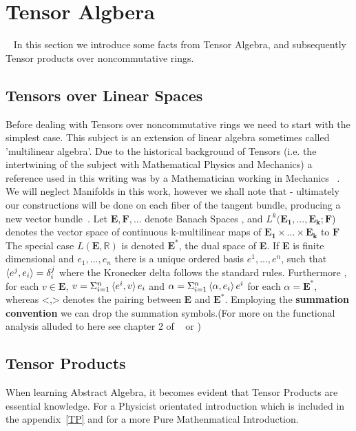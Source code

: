 \documentclass[preprint, 5p, 10pt]{elsarticle}
\theoremstyle{plain}
\begin{document}
\section{Tensor Algbera}~\cite{Lang,Yokonuma1992,Nielsen2000}
In this section we introduce some facts from Tensor Algebra, and subsequently Tensor products over noncommutative rings. 
\subsection{Tensors over Linear Spaces}
Before dealing with Tensors over noncommutative rings we need to start with the simplest
case. This subject is an extension of linear algebra sometimes called 'multilinear algebra'. Due to the 
historical background of Tensors (i.e. the intertwining of the subject with Mathematical Physics
and Mechanics) a reference used in this writing was by a Mathematician working in Mechanics ~\cite{Marsden}.
We will neglect Manifolds in this work, however we shall note that - ultimately our constructions will be
done on each fiber of the tangent bundle, producing a new vector bundle~\cite{GeometricPhasesinClassicalandQuantum,
Marsden,FoundationsDiffMan}. 
Let $\mathbf{E,F,...}$ denote Banach Spaces ,
and $L^{k}(\mathbf{E_{1},...,E_{k};F}$) denotes the vector space of continuous
k-multilinear maps of $\mathbf{E_{1}}\times...\times\mathbf{E_{k}}$ to $\mathbf{F}$
The special case $L(\mathbf{E},\mathbb{R})$ is denoted $\mathbf{E^{*}}$,
the dual space of \textbf{E}. If \textbf{E} is finite dimensional and ${e_{1},...,e_{n}}$ there is a 
unique ordered basis ${e^{1},...,e^{n}}$, such that $\braket{e^{j},e_{i}} = \delta^{j}_{i}$ where
the Kronecker delta follows the standard rules. Furthermore , for each $v \in \mathbf{E}$,
$v=\Sigma_{i=1}^{n}\braket{e^{i},v}e_{i}$ and $\alpha=\Sigma_{i=1}^{n}\braket{\alpha,e_{i}}e^{i}$
for each $\alpha = \mathbf{E}^{*}$, whereas <,> denotes the pairing between 
\textbf{E} and $\mathbf{E^{*}}$. Employing the \textbf{summation convention} we can drop the summation
symbols.(For more on the functional analysis alluded to here see chapter 2 of ~\cite{Marsden} or \cite{RudinFA})
\subsection{Tensor Products}
When learning Abstract Algebra, it becomes evident that Tensor Products are essential knowledge.
For a Physicist orientated introduction which is included in the appendix~\ref{TP}\cite{Nielsen2000} and for a more Pure Mathenmatical Introduction. 
\end{document}

